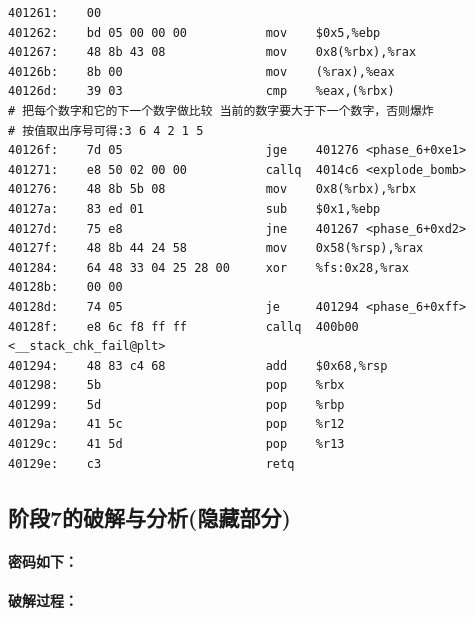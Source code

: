 \begin{verbatim}
401261:    00 
401262:    bd 05 00 00 00           mov    $0x5,%ebp
401267:    48 8b 43 08              mov    0x8(%rbx),%rax
40126b:    8b 00                    mov    (%rax),%eax
40126d:    39 03                    cmp    %eax,(%rbx)
# 把每个数字和它的下一个数字做比较 当前的数字要大于下一个数字，否则爆炸
# 按值取出序号可得:3 6 4 2 1 5
40126f:    7d 05                    jge    401276 <phase_6+0xe1>
401271:    e8 50 02 00 00           callq  4014c6 <explode_bomb>
401276:    48 8b 5b 08              mov    0x8(%rbx),%rbx
40127a:    83 ed 01                 sub    $0x1,%ebp
40127d:    75 e8                    jne    401267 <phase_6+0xd2>
40127f:    48 8b 44 24 58           mov    0x58(%rsp),%rax
401284:    64 48 33 04 25 28 00     xor    %fs:0x28,%rax
40128b:    00 00 
40128d:    74 05                    je     401294 <phase_6+0xff>
40128f:    e8 6c f8 ff ff           callq  400b00 <__stack_chk_fail@plt>
401294:    48 83 c4 68              add    $0x68,%rsp
401298:    5b                       pop    %rbx
401299:    5d                       pop    %rbp
40129a:    41 5c                    pop    %r12
40129c:    41 5d                    pop    %r13
40129e:    c3                       retq   
\end{verbatim}

\subsection{阶段7的破解与分析(隐藏部分)}

\paragraph{密码如下：}

\paragraph{破解过程：}
